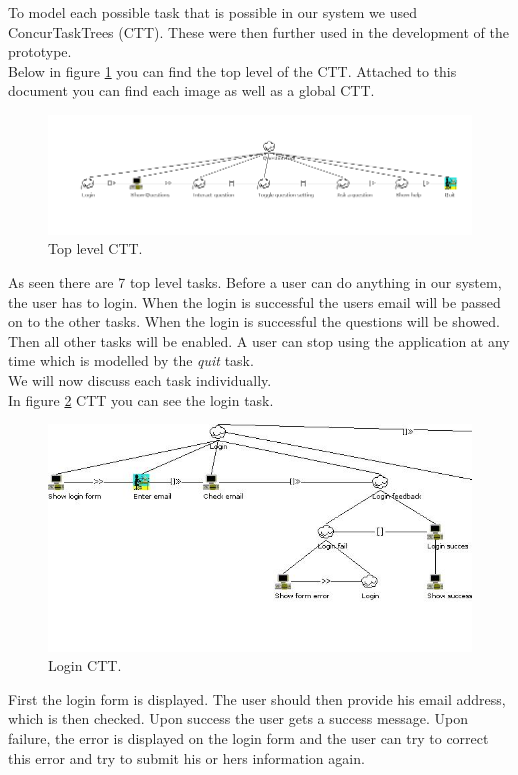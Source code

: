 To model each possible task that is possible in our system we used ConcurTaskTrees (CTT). These were then further used in the development of the prototype.\\
Below in figure \ref{fig:cttTop} you can find the top level of the CTT. Attached to this document you can find each image as well as a global CTT.

\begin{figure}[H]
\centering
\includegraphics[scale=0.5]{../../ctt/ctttoplevel.png}
\caption{Top level CTT.}
\label{fig:cttTop}
\end{figure}
As seen there are 7 top level tasks. Before a user can do anything in our system, the user has to login. When the login is successful the users email will be passed on to the other tasks. When the login is successful the questions will be showed. Then all other tasks will be enabled. A user can stop using the application at any time which is modelled by the \emph{quit} task.\\
We will now discuss each task individually.\\

In figure \ref{fig:ctt1} CTT you can see the login task.
\begin{figure}[H]
\centering
\includegraphics[scale=0.47]{../../ctt/ctt1.jpg}
\caption{Login CTT.}
\label{fig:ctt1}
\end{figure}
First the login form is displayed. The user should then provide his email address, which is then checked. Upon success the user gets a success message. Upon failure, the error is displayed on the login form and the user can try to correct this error and try to submit his or hers information again.\\

